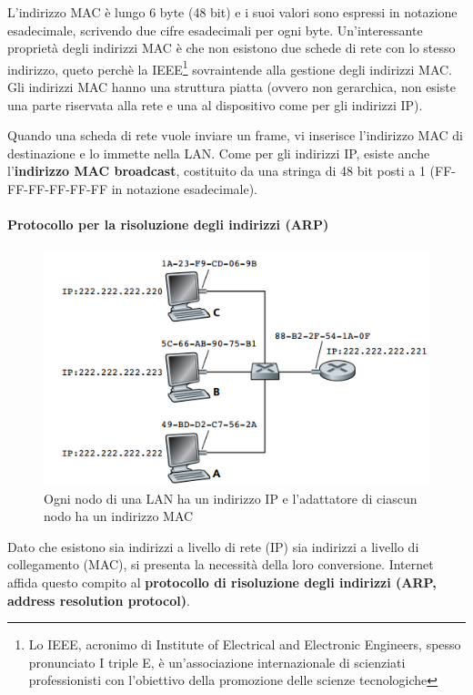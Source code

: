 \documentclass[11pt,a4paper]{article}
\begin{document}
{L'indirizzo MAC è lungo 6 byte (48 bit) e i suoi valori sono espressi in notazione esadecimale, scrivendo due cifre esadecimali per ogni byte. Un'interessante proprietà degli indirizzi MAC è che non esistono due schede di rete con lo stesso indirizzo, queto perchè la IEEE\footnote{Lo IEEE, acronimo di Institute of Electrical and Electronic Engineers, spesso pronunciato I triple E, è un'associazione internazionale di scienziati professionisti con l'obiettivo della promozione delle scienze tecnologiche} sovraintende alla gestione degli indirizzi MAC. Gli indirizzi MAC hanno una struttura piatta (ovvero non gerarchica, non esiste una parte riservata alla rete e una al dispositivo come per gli indirizzi IP).

Quando una scheda di rete vuole inviare un frame, vi inserisce l'indirizzo MAC di destinazione e lo immette nella LAN. Come per gli indirizzi IP, esiste anche l'\textbf{indirizzo MAC broadcast}, costituito da una stringa di 48 bit posti a 1 (FF-FF-FF-FF-FF-FF in notazione esadecimale).

\paragraph{Protocollo per la risoluzione degli indirizzi (ARP)}
\begin{figure}
	\includegraphics[scale=0.6]{img/084.png}
	\caption{Ogni nodo di una LAN ha un indirizzo IP e l'adattatore di ciascun nodo ha un indirizzo MAC}
	\label{fig: 084}
\end{figure}
Dato che esistono sia indirizzi a livello di rete (IP) sia indirizzi a livello di collegamento (MAC), si presenta la necessità della loro conversione. Internet affida questo compito al \textbf{protocollo di risoluzione degli indirizzi (ARP, address resolution protocol)}.

}
\end{document}
